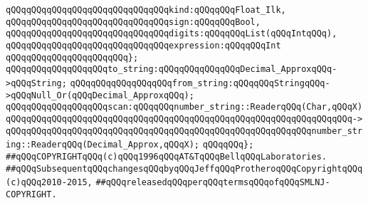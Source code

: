 \verb|qQQqqQQqqQQqqQQqqQQqqQQqqQQqqQQqkind:qQQqqQQqFloat_Ilk,|\newline
\verb|qQQqqQQqqQQqqQQqqQQqqQQqqQQqqQQqsign:qQQqqQQqBool,|\newline
\verb|qQQqqQQqqQQqqQQqqQQqqQQqqQQqqQQqdigits:qQQqqQQqList(qQQqIntqQQq),|\newline
\verb|qQQqqQQqqQQqqQQqqQQqqQQqqQQqqQQqexpression:qQQqqQQqInt|\newline
\verb|qQQqqQQqqQQqqQQqqQQqqQQq};|\newline
\newline
\verb|qQQqqQQqqQQqqQQqqQQqto_string:qQQqqQQqqQQqqQQqDecimal_ApproxqQQq->qQQqString;|\newline
\verb|qQQqqQQqqQQqqQQqqQQqfrom_string:qQQqqQQqStringqQQq->qQQqNull_Or(qQQqDecimal_ApproxqQQq);|\newline
\verb|qQQqqQQqqQQqqQQqqQQqscan:qQQqqQQqnumber_string::ReaderqQQq(Char,qQQqX)|\newline
\verb|qQQqqQQqqQQqqQQqqQQqqQQqqQQqqQQqqQQqqQQqqQQqqQQqqQQqqQQqqQQqqQQqqQQq->|\newline
\verb|qQQqqQQqqQQqqQQqqQQqqQQqqQQqqQQqqQQqqQQqqQQqqQQqqQQqqQQqqQQqnumber_string::ReaderqQQq(Decimal_Approx,qQQqX);|\newline
\newline
\verb|qQQqqQQq};|\newline
\newline
\newline
\newline
\newline
\verb|##qQQqCOPYRIGHTqQQq(c)qQQq1996qQQqAT&TqQQqBellqQQqLaboratories.|\newline
\verb|##qQQqSubsequentqQQqchangesqQQqbyqQQqJeffqQQqProtheroqQQqCopyrightqQQq(c)qQQq2010-2015,|\newline
\verb|##qQQqreleasedqQQqperqQQqtermsqQQqofqQQqSMLNJ-COPYRIGHT.|\newline

